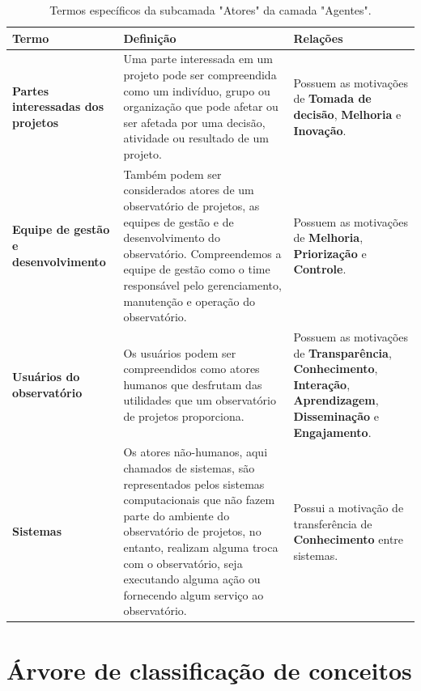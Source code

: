 \begin{apendicesenv}
\begin{table}[H]
\centering
\caption{Termos específicos da subcamada "Atores" da camada "Agentes".}
\begin{tabularx}{\textwidth}{|l|X|X|}
\hline
\textbf{Termo} & \textbf{Definição} & \textbf{Relações} \\ \hline
\textbf{Partes interessadas dos projetos}  & Uma parte interessada em um projeto pode ser compreendida
como um indivíduo, grupo ou organização que pode afetar ou ser afetada por uma
decisão, atividade ou resultado de um projeto. & Possuem as motivações de \textbf{Tomada de decisão}, \textbf{Melhoria} e \textbf{Inovação}. \\ \hline
\textbf{Equipe de gestão e desenvolvimento}  & Também podem ser considerados atores de um observatório de projetos, as equipes de gestão e de desenvolvimento do observatório. Compreendemos a equipe de gestão como o time responsável pelo gerenciamento, manutenção e operação do observatório. & Possuem as motivações de \textbf{Melhoria}, \textbf{Priorização} e \textbf{Controle}. \\ \hline
\textbf{Usuários do observatório} & Os usuários podem ser compreendidos como atores humanos que desfrutam das utilidades que um observatório de projetos proporciona. & Possuem as motivações de \textbf{Transparência}, \textbf{Conhecimento}, \textbf{Interação}, \textbf{Aprendizagem}, \textbf{Disseminação} e \textbf{Engajamento}.\\ \hline
\textbf{Sistemas}   & Os atores não-humanos, aqui chamados de sistemas, são representados pelos sistemas computacionais que não fazem parte do ambiente do observatório de projetos, no entanto, realizam alguma troca com o observatório, seja executando alguma ação ou
fornecendo algum serviço ao observatório.
 & Possui a motivação de transferência de \textbf{Conhecimento} entre sistemas. \\ \hline
\end{tabularx}
\end{table}

\section{Árvore de classificação de conceitos}


\end{apendicesenv}
